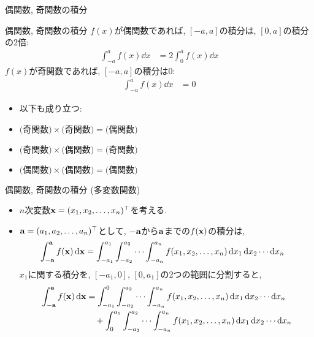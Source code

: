 \documentclass[dvipdfmx,notheorems,t]{beamer}
\begin{document}
\begin{frame}{偶関数, 奇関数の積分}
\begin{block}{偶関数, 奇関数の積分}
  $f(x)$が偶関数であれば, $[-a, a]$の積分は, $[0, a]$の積分の2倍:
  \begin{align*}
    \int_{-a}^a f(x) \dd{x} &= 2 \int_0^a f(x) \dd{x}
  \end{align*}
  $f(x)$が奇関数であれば, $[-a, a]$の積分は$0$:
  \begin{align*}
    \int_{-a}^a f(x) \dd{x} &= 0
  \end{align*}
\end{block}

\begin{itemize}
  \item 以下も成り立つ:
  \item $\text{(奇関数)} \times \text{(奇関数)} = \text{(偶関数)}$
  \item $\text{(奇関数)} \times \text{(偶関数)} = \text{(奇関数)}$
  \item $\text{(偶関数)} \times \text{(偶関数)} = \text{(偶関数)}$
\end{itemize}
\end{frame}

\begin{frame}{偶関数, 奇関数の積分 (多変数関数)}
\begin{itemize}
  \item $n$次変数$\vb{x} = (x_1, x_2, \ldots, x_n)^\top$を考える.
  \item $\vb{a} = (a_1, a_2, \ldots, a_n)^\top$として, $-\vb{a}$から$\vb{a}$までの$f(\vb{x})$の積分は,
  \begin{align*}
    \int_{-\vb{a}}^{\vb{a}} f(\vb{x}) \dd{\vb{x}}
      &= \int_{-a_1}^{a_1} \int_{-a_2}^{a_2} \cdots \int_{-a_n}^{a_n} f(x_1, x_2, \ldots, x_n)
        \dd{x_1} \dd{x_2} \cdots \dd{x_n}
  \end{align*}
  $x_1$に関する積分を, $[-a_1, 0]$, $[0, a_1]$の2つの範囲に分割すると,
  \begin{align*}
    \int_{-\vb{a}}^{\vb{a}} f(\vb{x}) \dd{\vb{x}}
      &= \int_{-a_1}^0 \int_{-a_2}^{a_2} \cdots \int_{-a_n}^{a_n} f(x_1, x_2, \ldots, x_n)
        \dd{x_1} \dd{x_2} \cdots \dd{x_n} \\
      & \quad + \int_0^{a_1} \int_{-a_2}^{a_2} \cdots \int_{-a_n}^{a_n} f(x_1, x_2, \ldots, x_n)
        \dd{x_1} \dd{x_2} \cdots \dd{x_n}
  \end{align*}
\end{itemize}
\end{frame}
\end{document}
